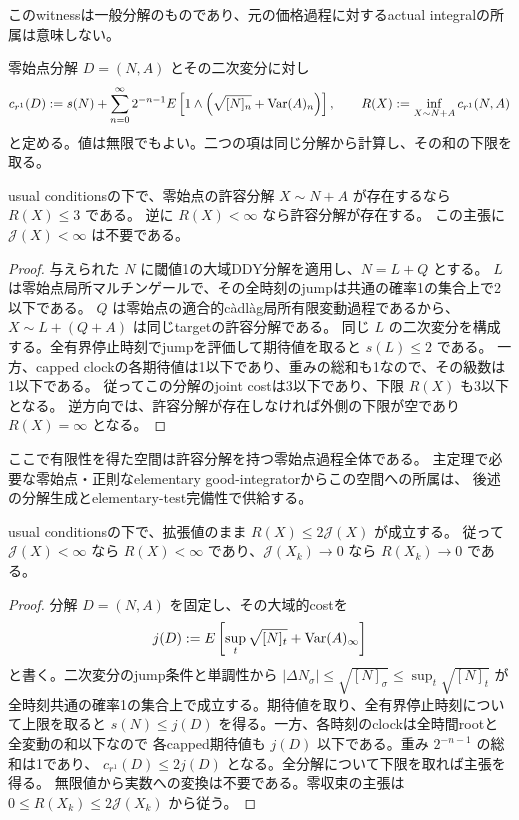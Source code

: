 このwitnessは一般分解のものであり、元の価格過程に対するactual integralの所属は意味しない。
\begin{definition}[零始点の補助cost]
零始点分解 $D=(N,A)$ とその二次変分に対し
\[
 c_{r^1}(D):=s(N)+\sum_{n=0}^\infty 2^{-n-1}
 E\left[1\wedge\left(\sqrt{[N]_n}+\operatorname{Var}(A)_n\right)\right],
 \qquad R(X):=\inf_{X\sim N+A}c_{r^1}(N,A)
\]
と定める。値は無限でもよい。二つの項は同じ分解から計算し、その和の下限を取る。
\end{definition}
\begin{lemma}[許容分解を持つ全過程での補助costの有限性]
usual conditionsの下で、零始点の許容分解 $X\sim N+A$ が存在するなら $R(X)\le3$ である。
逆に $R(X)<\infty$ なら許容分解が存在する。
この主張に $\mathcal J(X)<\infty$ は不要である。
\end{lemma}
\begin{proof}
与えられた $N$ に閾値1の大域DDY分解を適用し、$N=L+Q$ とする。
$L$ は零始点局所マルチンゲールで、その全時刻のjumpは共通の確率1の集合上で2以下である。
$Q$ は零始点の適合的càdlàg局所有限変動過程であるから、
$X\sim L+(Q+A)$ は同じtargetの許容分解である。
同じ $L$ の二次変分を構成する。全有界停止時刻でjumpを評価して期待値を取ると $s(L)\le2$ である。
一方、capped clockの各期待値は1以下であり、重みの総和も1なので、その級数は1以下である。
従ってこの分解のjoint costは3以下であり、下限 $R(X)$ も3以下となる。
逆方向では、許容分解が存在しなければ外側の下限が空であり $R(X)=\infty$ となる。
\end{proof}
ここで有限性を得た空間は許容分解を持つ零始点過程全体である。
主定理で必要な零始点・正則なelementary good-integratorからこの空間への所属は、
後述の分解生成とelementary-test完備性で供給する。
\begin{lemma}[大域的costから補助costへの評価]
usual conditionsの下で、拡張値のまま $R(X)\le2\mathcal J(X)$ が成立する。
従って $\mathcal J(X)<\infty$ なら $R(X)<\infty$ であり、$\mathcal J(X_k)\to0$ なら $R(X_k)\to0$ である。
\end{lemma}
\begin{proof}
分解 $D=(N,A)$ を固定し、その大域的costを
\[
 j(D):=E\left[\sup_t\sqrt{[N]_t}+\operatorname{Var}(A)_\infty\right]
\]
と書く。二次変分のjump条件と単調性から
$|\Delta N_\sigma|\le\sqrt{[N]_\sigma}\le\sup_t\sqrt{[N]_t}$ が
全時刻共通の確率1の集合上で成立する。期待値を取り、全有界停止時刻について上限を取ると
$s(N)\le j(D)$ を得る。一方、各時刻のclockは全時間rootと全変動の和以下なので
各capped期待値も $j(D)$ 以下である。重み $2^{-n-1}$ の総和は1であり、
$c_{r^1}(D)\le2j(D)$ となる。全分解について下限を取れば主張を得る。
無限値から実数への変換は不要である。零収束の主張は $0\le R(X_k)\le2\mathcal J(X_k)$ から従う。
\end{proof}
